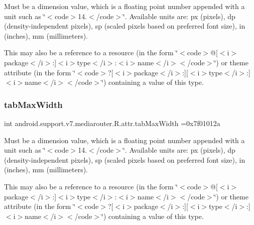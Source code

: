 Must be a dimension value, which is a floating point number appended with a unit such as \char`\"{}$<$code$>$14.\+5sp$<$/code$>$\char`\"{}. Available units are\+: px (pixels), dp (density-\/independent pixels), sp (scaled pixels based on preferred font size), in (inches), mm (millimeters). 

This may also be a reference to a resource (in the form \char`\"{}$<$code$>$@\mbox{[}$<$i$>$package$<$/i$>$\+:\mbox{]}$<$i$>$type$<$/i$>$\+:$<$i$>$name$<$/i$>$$<$/code$>$\char`\"{}) or theme attribute (in the form \char`\"{}$<$code$>$?\mbox{[}$<$i$>$package$<$/i$>$\+:\mbox{]}\mbox{[}$<$i$>$type$<$/i$>$\+:\mbox{]}$<$i$>$name$<$/i$>$$<$/code$>$\char`\"{}) containing a value of this type. \mbox{\label{classandroid_1_1support_1_1v7_1_1mediarouter_1_1R_1_1attr_a5d37021f678dae9aba1c7ecb8fc25235}} 
\subsubsection{\texorpdfstring{tab\+Max\+Width}{tabMaxWidth}}
{\footnotesize\ttfamily int android.\+support.\+v7.\+mediarouter.\+R.\+attr.\+tab\+Max\+Width =0x7f01012a\hspace{0.3cm}{\ttfamily [static]}}

Must be a dimension value, which is a floating point number appended with a unit such as \char`\"{}$<$code$>$14.\+5sp$<$/code$>$\char`\"{}. Available units are\+: px (pixels), dp (density-\/independent pixels), sp (scaled pixels based on preferred font size), in (inches), mm (millimeters). 

This may also be a reference to a resource (in the form \char`\"{}$<$code$>$@\mbox{[}$<$i$>$package$<$/i$>$\+:\mbox{]}$<$i$>$type$<$/i$>$\+:$<$i$>$name$<$/i$>$$<$/code$>$\char`\"{}) or theme attribute (in the form \char`\"{}$<$code$>$?\mbox{[}$<$i$>$package$<$/i$>$\+:\mbox{]}\mbox{[}$<$i$>$type$<$/i$>$\+:\mbox{]}$<$i$>$name$<$/i$>$$<$/code$>$\char`\"{}) containing a value of this type. \mbox{\label{classandroid_1_1support_1_1v7_1_1mediarouter_1_1R_1_1attr_ad7f198acb179f92ba3cb636e16e779d2}} 
